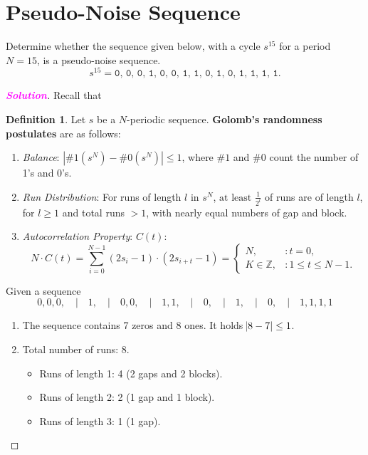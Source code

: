 \documentclass[12pt,openany]{book}
\theoremstyle{definition}
\newtheorem{definition}{Definition}[chapter]
\newcommand{\Z}{\mathbb{Z}}
\newcommand{\sol}{\textcolor{magenta}{\bf Solution}}
\begin{document}
\section{Pseudo-Noise Sequence}
Determine whether the sequence given below, with a cycle \( s^{15} \) for a period \( N=15 \), is a pseudo-noise sequence.
\[
s^{15} = \texttt{0, 0, 0, 1, 0, 0, 1, 1, 0, 1, 0, 1, 1, 1, 1}.
\]
\begin{proof}[\sol]
	Recall that 
	\\
	\begin{tcolorbox}[colback=white,colframe=defcolor,arc=5pt,title={\color{white}\bf Golomb's Randomness Postulates}]
		\begin{definition}
			Let \( s \) be a $N$-periodic sequence. \textbf{Golomb's randomness postulates} are as follows:
			\begin{enumerate}[\textbf{R}1]
				\item \textit{Balance}: \( \left| \#1(s^N) - \#0(s^N) \right| \leq 1 \), where \( \#1 \) and \( \#0 \) count the number of 1’s and 0’s.
				\item \textit{Run Distribution}: For runs of length \( l \) in \( s^N \), \( \text{at least } \frac{1}{2^l} \) of runs are of length \( l \), for \( l \geq 1 \) and total runs \( > 1 \), with nearly equal numbers of gap and block.
				\item \textit{Autocorrelation Property}: \( C(t) \): 
				\[
				N \cdot C(t)=\sum_{i=0}^{N-1}(2s_i - 1) \cdot (2s_{i+t} - 1)=
				\begin{cases} 
					N, & : t = 0, \\
					K\in\Z, & : 1 \leq t \leq N - 1.
				\end{cases}
				\]
			\end{enumerate}
		\end{definition}
	\end{tcolorbox}
	Given a sequence \[
	0, 0, 0, \quad|\quad 1, \quad|\quad 0, 0, \quad|\quad 1, 1, \quad|\quad 0, \quad|\quad 1, \quad|\quad 0, \quad|\quad 1, 1, 1, 1
	\]
	\begin{enumerate}[\textbf{R}1]
		\item The sequence contains 7 zeros and 8 ones. It holds $\abs{8-7}\leq 1$.
		\item Total number of runs: 8.
		\begin{itemize}
			\item Runs of length 1: 4 (2 gaps and 2 blocks).
			\item Runs of length 2: 2 (1 gap and 1 block).
			\item Runs of length 3: 1 (1 gap).

\end{itemize}
\end{enumerate}
\end{proof}
\end{document}

